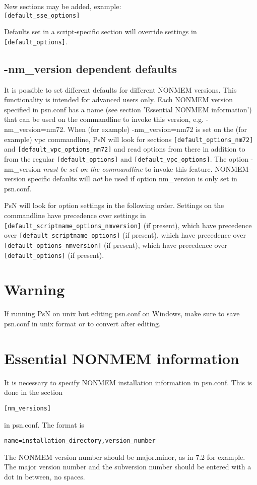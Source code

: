 \noindent New sections may be added, example:\\
\verb|[default_sse_options]|

\noindent Defaults set in a script-specific section will override settings in \verb|[default_options]|.
\subsection{-nm\_version dependent defaults}
It is possible to set different defaults for different NONMEM versions. 
This functionality is intended for advanced users only.
Each NONMEM version specified in psn.conf has a name
(see section 'Essential NONMEM information') that can be used on the commandline to invoke this version, e.g. -nm\_version=nm72.
When (for example) -nm\_version=nm72 is set on the (for example) vpc commandline, PsN will look for sections \verb|[default_options_nm72]| 
and \verb|[default_vpc_options_nm72]| and read options from there in addition to 
from the regular \verb|[default_options]| and \verb|[default_vpc_options]|. The option -nm\_version \emph{must be set on the commandline}
to invoke this feature. NONMEM-version specific defaults will \emph{not} be used if option nm\_version is only set in psn.conf.

PsN will look for option settings in the following order.
Settings on the commandline have precedence over settings in 
\verb|[default_scriptname_options_nmversion]| (if present), which have precedence over 
\verb|[default_scriptname_options]| (if present), which have precedence over
\verb|[default_options_nmversion]| (if present), which have precedence over \verb|[default_options]| (if present). 

\section{Warning}
If running PsN on unix but editing psn.conf on Windows, make sure to save psn.conf in unix format or to convert after editing.

\section{Essential NONMEM information}
It is necessary to specify NONMEM installation information in psn.conf. This is done in the section
\begin{verbatim}
[nm_versions]
\end{verbatim}
in psn.conf. The format is 
\begin{verbatim}
name=installation_directory,version_number
\end{verbatim}
The NONMEM version number should be major.minor, as in 7.2 for example.
The major version number and the subversion number should be entered with a dot in between, no spaces.  

